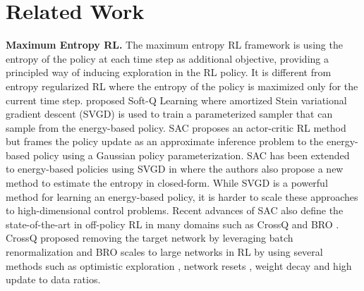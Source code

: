 \section{Related Work} \label{sec:rel_work}
\textbf{Maximum Entropy RL.} 
The maximum entropy RL framework is using the entropy of the policy at each time step as additional objective, providing a principled way of inducing exploration in the RL policy. It is different from entropy regularized RL \cite{neu2017unified} where the entropy of the policy is maximized only for the current time step.
\citet{haarnoja2017reinforcement} proposed Soft-Q Learning where amortized Stein variational gradient descent \cite{wang2016learning} (SVGD) is used to train a parameterized sampler that can sample from the energy-based policy. SAC \cite{haarnoja2018soft} proposes an actor-critic RL method but frames the policy update as an approximate inference problem to the energy-based policy using a Gaussian policy parameterization. 
SAC has been extended to energy-based policies using SVGD in \cite{messaouds} where the authors also propose a new method to estimate the entropy in closed-form. While SVGD is a powerful method for learning an energy-based policy, it is harder to scale these approaches to high-dimensional control problems. 
Recent advances of SAC also define the state-of-the-art in off-policy RL in many domains such as CrossQ \cite{bhattcrossq} and BRO \cite{nauman2024bigger}. CrossQ proposed removing the target network by leveraging batch renormalization and BRO scales to large networks in RL by using several methods such as optimistic exploration \cite{nauman2023theory}, network resets \cite{nikishin2022primacy}, weight decay and high update to data ratios. 

